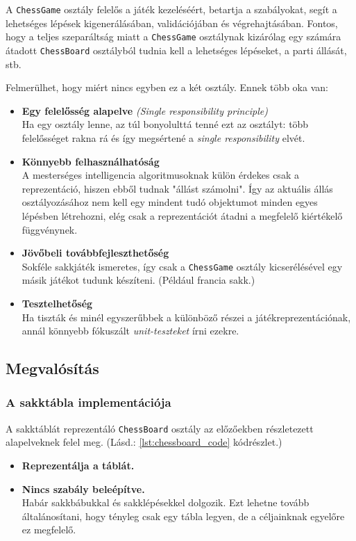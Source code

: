\documentclass[twoside, a4paper, 12pt]{article}
\begin{document}
A \texttt{ChessGame} osztály felelős a játék kezeléséért, betartja a szabályokat, segít a lehetséges lépések kigenerálásában, validációjában és végrehajtásában. Fontos, hogy a teljes szeparáltság miatt a \texttt{ChessGame} osztálynak kizárólag egy számára átadott \texttt{ChessBoard} osztályból tudnia kell a lehetséges lépéseket, a parti állását, stb.

Felmerülhet, hogy miért nincs egyben ez a két osztály. Ennek több oka van:

\begin{itemize}
	\item \textbf{Egy felelősség alapelve} \textit{(Single responsibility principle)}\cite{SingleResponsibilityHu}~\cite{SingleResponsibilityEn}~\cite{SOLID}~ \\
	Ha egy osztály lenne, az túl bonyolulttá tenné ezt az osztályt: több felelősséget rakna rá és így megsértené a \textit{single responsibility} elvét.
	\item \textbf{Könnyebb felhasználhatóság} \\
	A mesterséges intelligencia algoritmusoknak külön érdekes csak a reprezentáció, hiszen ebből tudnak "állást számolni". Így az aktuális állás osztályozásához nem kell egy mindent tudó objektumot minden egyes lépésben létrehozni, elég csak a reprezentációt átadni a megfelelő kiértékelő függvénynek.
	\item \textbf{Jövőbeli továbbfejleszthetőség} \\
	Sokféle sakkjáték ismeretes, így csak a \texttt{ChessGame} osztály kicserélésével egy másik játékot tudunk készíteni. (Például francia sakk.)
	\item \textbf{Tesztelhetőség} \\
	Ha tiszták és minél egyszerűbbek a különböző részei a játékreprezentációnak, annál könnyebb fókuszált \textit{unit-teszteket} írni ezekre.
\end{itemize}

\subsection{Megvalósítás}

\subsubsection{A sakktábla implementációja}
A sakktáblát reprezentáló \texttt{ChessBoard} osztály az előzőekben részletezett alapelveknek felel meg. (Lásd.: \ref{lst:chessboard_code} kódrészlet.)
\begin{itemize}
	\item \textbf{Reprezentálja a táblát.}
	\item \textbf{Nincs szabály beleépítve.} \\ 
	Habár sakkbábukkal és sakklépésekkel dolgozik. Ezt lehetne tovább általánosítani, hogy tényleg csak egy tábla legyen, de a céljainknak egyelőre ez megfelelő.
\end{itemize}
\end{document}

